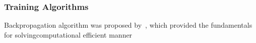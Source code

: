 \subsubsection{Training Algorithms}
Backpropagation algorithm was proposed by~\citet{werbos1975beyond}, which provided the fundamentals for solvingcomputational efficient manner